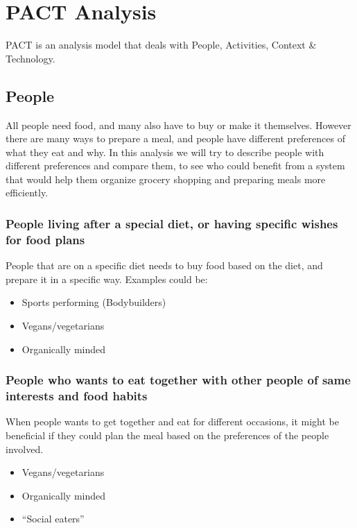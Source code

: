 \section{PACT Analysis}
PACT is an analysis model that deals with People, Activities, Context \& Technology.

\subsection{People}
All people need food, and many also have to buy or make it themselves. However there are many ways to prepare a meal, and people have different preferences of what they eat and why. In this analysis we will try to describe people with different preferences and compare them, to see who could benefit from a system that would help them organize grocery shopping and preparing meals more efficiently.

\subsubsection{People living after a special diet, or having specific wishes for food plans}
People that are on a specific diet needs to buy food based on the diet, and prepare it in a specific way.
Examples could be:
\begin{itemize}
\item Sports performing (Bodybuilders)
\item Vegans/vegetarians
\item Organically minded
\end{itemize}

\subsubsection{People who wants to eat together with other people of same interests and food habits}
When people wants to get together and eat for different occasions, it might be beneficial if they could plan the meal based on the preferences of the people involved.
\begin{itemize}
\item Vegans/vegetarians
\item Organically minded
\item “Social eaters”
\end{itemize}

